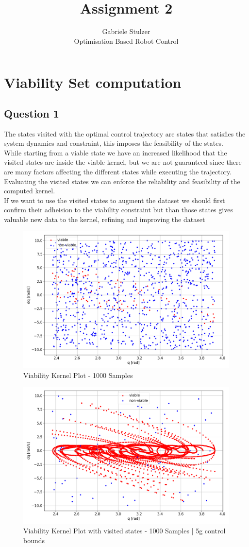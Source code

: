 \documentclass[12pt]{article}
\begin{document}
\title{Assignment 2}
\author{Gabriele Stulzer\\ 
Optimisation-Based Robot Control}
 
\maketitle

\section*{Viability Set computation}
 
\subsection*{Question 1}
\textit{}
The states visited with the optimal control trajectory are states that satisfies the system dynamics and constraint, this imposes the feasibility of the states.\\
While starting from a viable state we have an increased likelihood that the visited states are inside the viable kernel, but we are not guaranteed since there are many factors affecting the different states
while executing the trajectory.\\
Evaluating the visited states we can enforce the reliability and feasibility of the computed kernel.\\
If we want to use the visited states to augment the dataset we should first confirm their adheision to the viability constraint but than those states gives valuable new data to the kernel, refining and improving the dataset

\begin{figure}[h!]
    \centering
    \includegraphics[width=0.5\linewidth]{ViabilityKernelPlot.png}
    \caption{Viability Kernel Plot - 1000 Samples}\label{fig:oscvsic}
\end{figure}

\begin{figure}[h!]
    \centering
    \includegraphics[width=0.5\linewidth]{UsingComputedStatesInKernelSet.png}
    \caption{Viability Kernel Plot with visited states - 1000 Samples | 5g control bounds}\label{fig:oscvsic}
\end{figure}
\end{document}
